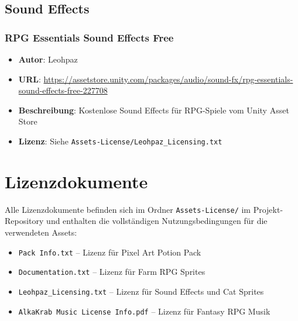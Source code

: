 \documentclass[
  a4paper,
  11pt,
  ngerman,
  parskip=half,
  bibliography=totoc,
  listof=totoc
]{scrreprt}
\begin{document}
\subsection{Sound Effects}

\subsubsection{RPG Essentials Sound Effects Free}
\begin{itemize}
    \item \textbf{Autor}: Leohpaz
    \item \textbf{URL}: \url{https://assetstore.unity.com/packages/audio/sound-fx/rpg-essentials-sound-effects-free-227708}
    \item \textbf{Beschreibung}: Kostenlose Sound Effects für RPG-Spiele vom Unity Asset Store
    \item \textbf{Lizenz}: Siehe \texttt{Assets-License/Leohpaz\_Licensing.txt}
\end{itemize}

\section{Lizenzdokumente}

Alle Lizenzdokumente befinden sich im Ordner \texttt{Assets-License/} im Projekt-Repository und enthalten die vollständigen Nutzungsbedingungen für die verwendeten Assets:

\begin{itemize}
    \item \texttt{Pack Info.txt} -- Lizenz für Pixel Art Potion Pack
    \item \texttt{Documentation.txt} -- Lizenz für Farm RPG Sprites
    \item \texttt{Leohpaz\_Licensing.txt} -- Lizenz für Sound Effects und Cat Sprites
    \item \texttt{AlkaKrab Music License Info.pdf} -- Lizenz für Fantasy RPG Musik
\end{itemize}


\newpage
\printbibliography
\end{document}
